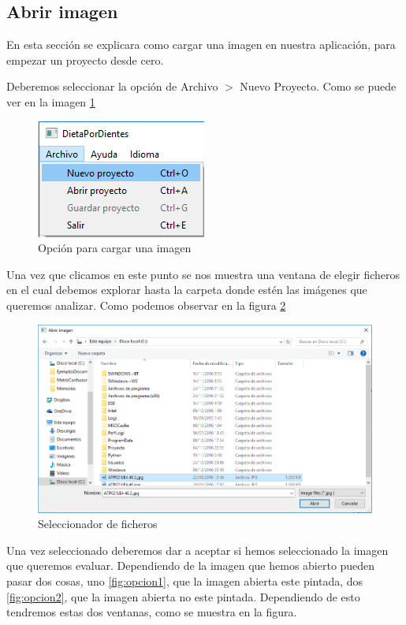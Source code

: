 \documentclass[13pt]{book}              %
\begin{document}
{\label{modo:1}
\subsection{Abrir imagen}
En esta sección se explicara como cargar una imagen en nuestra aplicación, para empezar un proyecto desde cero.

Deberemos seleccionar la opción de Archivo  $>$ Nuevo Proyecto. Como se puede ver en la imagen \ref{fig:abrirPro}

\begin{figure}[h]
\centering
\includegraphics[width=.50\textwidth]{AbrirImagen}
\caption{Opción para cargar una imagen}
\label{fig:abrirPro}
\end{figure}

Una vez que clicamos en este punto se nos muestra una ventana de elegir ficheros en el cual debemos explorar hasta la carpeta donde estén las imágenes que queremos analizar. Como podemos observar en la figura \ref{fig:abrirPaso2}

\begin{figure}[h]
\centering
\includegraphics[width=.99\textwidth]{AbrirPaso2}
\caption{Seleccionador de ficheros}
\label{fig:abrirPaso2}
\end{figure}

Una vez seleccionado deberemos dar a aceptar si hemos seleccionado la imagen que queremos evaluar.
Dependiendo de la imagen que hemos abierto pueden pasar dos cosas, uno \ref{fig:opcion1}, que la imagen abierta este pintada, dos \ref{fig:opcion2}, que la imagen abierta no este pintada. Dependiendo de esto tendremos estas dos ventanas, como se muestra en la figura.


}
\end{document}
